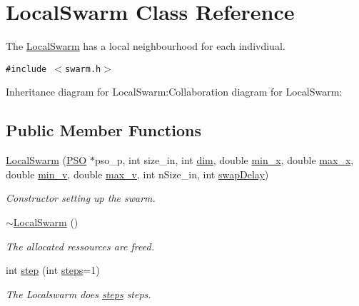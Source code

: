 \hypertarget{classLocalSwarm}{
\section{LocalSwarm Class Reference}
\label{classLocalSwarm}
}
The \hyperlink{classLocalSwarm}{LocalSwarm} has a local neighbourhood for each indivdiual.  


{\tt \#include $<$swarm.h$>$}

Inheritance diagram for LocalSwarm:Collaboration diagram for LocalSwarm:\subsection*{Public Member Functions}
\begin{CompactItemize}
\item 
\hyperlink{classLocalSwarm_483bb3b9c79778185e8898b3f8aa9820}{LocalSwarm} (\hyperlink{classPSO}{PSO} $\ast$pso\_\-p, int size\_\-in, int \hyperlink{runpso_8cpp_70b5e28b5bc3d1b63a7435c5fe50b837}{dim}, double \hyperlink{classSwarm_b504e23c39413573e3685a88435f5f85}{min\_\-x}, double \hyperlink{classSwarm_e5075d21be96c1cdf441bc2b612177c1}{max\_\-x}, double \hyperlink{classSwarm_160c79397ea811636e17c0e4d6297729}{min\_\-v}, double \hyperlink{classSwarm_2b0dbde2c275f991580a07a745cb5ade}{max\_\-v}, int nSize\_\-in, int \hyperlink{classLocalSwarm_18972161a1402048e67aa08b526ce7dc}{swapDelay})
\begin{CompactList}\small\item\em Constructor setting up the swarm. \item\end{CompactList}\item 
\hyperlink{classLocalSwarm_db0bcad7f87d0e0a3216cf26512869ad}{$\sim$LocalSwarm} ()
\begin{CompactList}\small\item\em The allocated ressources are freed. \item\end{CompactList}\item 
int \hyperlink{classLocalSwarm_0321819616ea5252dde257b6d1f739db}{step} (int \hyperlink{runpso_8cpp_b4ae7205573977222eadd0795db193e2}{steps}=1)
\begin{CompactList}\small\item\em The Localswarm does \hyperlink{runpso_8cpp_b4ae7205573977222eadd0795db193e2}{steps} steps. \item\end{CompactList}\end{CompactItemize}
